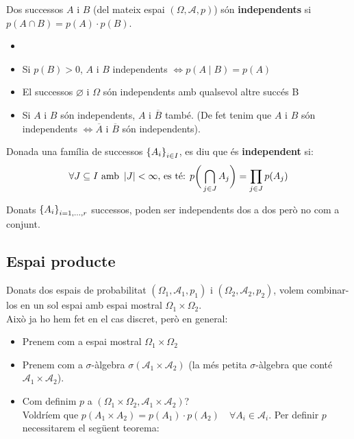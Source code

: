\begin{defi}
  Dos successos $A$ i $B$ (del mateix espai $(\Omega, \mathcal{A}, p)$) són \textbf{independents} si $p(A\cap B) = p(A)\cdot p(B)$.
\end{defi}

\begin{obs}
  \begin{itemize}
      \item []
      \item Si $p(B) > 0$, $A$ i $B$ independents $\iff p(A\mid B)=p(A)$
      \item El successos $\varnothing$ i $\Omega$ són independents amb qualsevol altre succés B
      \item Si $A$ i $B$ són independents, $A$ i $\overline{B}$ també. (De fet tenim que $A$ i $B$ són independents $\iff \overline{A}$ i $\overline{B}$ són independents).
  \end{itemize}
\end{obs}

\begin{defi}
  Donada una família de successos $\left\{A_{i}\right\}_{i\in I}$, es diu que és \textbf{independent} si:
  \[
    \forall J \subseteq I \text{ amb } \left\vert J \right\vert < \infty \text{, es té: } p\bigg(\bigcap\limits_{j\in J}A_{j}\bigg) = \prod_{j\in J}p(A_{j}) 
  \]
\end{defi}

\begin{obs}
  Donats $\left\{A_{i}\right\}_{i = 1, \ldots, r}$ successos, poden ser independents dos a dos però no com a conjunt.
\end{obs}

\newpage

\subsection{Espai producte}

Donats dos espais de probabilitat $(\Omega_{1}, \mathcal{A}_{1}, p_{1})$ i $(\Omega_{2}, \mathcal{A}_{2}, p_{2})$, volem combinar-los en un sol espai amb espai mostral $\Omega_{1}\times\Omega_{2}$. \\
Això ja ho hem fet en el cas discret, però en general:
\begin{itemize}
    \item Prenem com a espai mostral $\Omega_{1}\times\Omega_{2}$
    \item Prenem com a $\sigma$-àlgebra $\sigma(\mathcal{A}_{1}\times\mathcal{A}_{2})$ (la més petita $\sigma$-àlgebra que conté $\mathcal{A}_{1}\times\mathcal{A}_{2}$).
    \item Com definim $p$ a $(\Omega_{1}\times\Omega_{2}, \mathcal{A}_{1}\times\mathcal{A}_{2})$? \\ Voldríem que $p(A_{1}\times A_{2}) = p(A_{1})\cdot p(A_{2}) \quad \forall A_{i} \in \mathcal{A}_{i}$. Per definir $p$ necessitarem el següent teorema:
\end{itemize}

